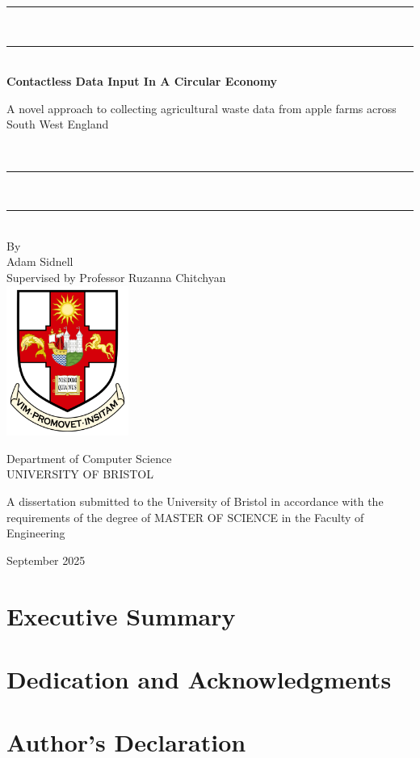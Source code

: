 \documentclass{article}
\begin{document}
\begin{titlepage}
    \centering
    
    \rule{\textwidth}{2pt} \\[-0.4ex] 
    \rule{\textwidth}{0.5pt} \\[1cm] 
    
    {\LARGE\bfseries Contactless Data Input In A Circular Economy} \\[0.5cm]
    
    \parbox{0.89\textwidth}{\centering
    {\large A novel approach to collecting agricultural waste data from apple farms across South West England}
    } \\[0.5cm]
    
    \rule{\textwidth}{0.5pt} \\[-0.4ex] 
    \rule{\textwidth}{2pt} \\[1cm]   
    
    {\large By} \\[0.5cm]
    {\large Adam Sidnell} \\[1cm]
    {\large Supervised by Professor Ruzanna Chitchyan} \\[1.5cm]
    
    \includegraphics[width=0.3\textwidth]{uob_logo.png} \\[1.5cm]
    
    \begin{minipage}{0.6\textwidth} %
        \centering
        {\Large Department of Computer Science} \\[0.5cm]
        {\Large UNIVERSITY OF BRISTOL} \\[1cm]
        \begin{flushleft}
        {\normalsize A dissertation submitted to the University of Bristol in accordance with the requirements of the degree of MASTER OF SCIENCE in the Faculty of Engineering} \\[1cm]
        \end{flushleft}
        {\large September 2025}
    \end{minipage}

    
    \vfill

\end{titlepage}

\section{Executive Summary}
\section{Dedication and Acknowledgments}
\section{Author's Declaration}
\
\end{document}

